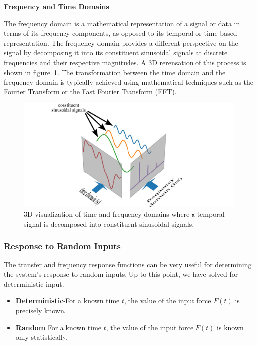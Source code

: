 \documentclass[12pt,letter]{article}
\begin{document}
\begin{review}
	\label{sec:TimeFrequencySpectrum}

	\textbf{Frequency and Time Domains}

	\noindent The frequency domain is a mathematical representation of a signal or data in terms of its frequency components, as opposed to its temporal or time-based representation. The frequency domain provides a different perspective on the signal by decomposing it into its constituent sinusoidal signals at discrete frequencies and their respective magnitudes. A 3D rerensation of this process is shown in figure~\ref{fig:3D_time_frequency_analysis}. The transformation between the time domain and the frequency domain is typically achieved using mathematical techniques such as the Fourier Transform or the Fast Fourier Transform (FFT).

		\begin{figure}[H]
			\centering
			\includegraphics[width=6in]{../figures/3D_time_frequency_analysis}
			\caption{3D visualization of time and frequency domains where a temporal signal is decomposed into constituent sinusoidal signals.}
			\label{fig:3D_time_frequency_analysis}
		\end{figure}

\end{review}

\subsubsection{Response to Random Inputs}
The transfer and frequency response functions can be very useful for determining the system's response to random inputs. Up to this point, we have solved for deterministic input. 

\begin{itemize}
\item \textbf{Deterministic}-For a known time $t$, the value of the input force $F(t)$ is precisely known. 
\item \textbf{Random} For a known time $t$, the value of the input force $F(t)$ is known only statistically. 
\end{itemize}
\end{document}
